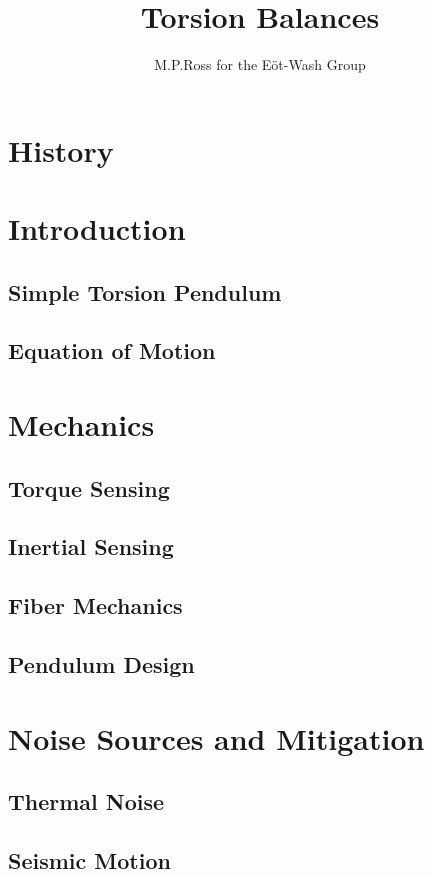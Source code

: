 \documentclass{article}
\begin{document}
\title{Torsion Balances}
\author{M.P.Ross for the E\"ot-Wash Group}

\maketitle
\tableofcontents
\section{History}
\section{Introduction}
\subsection{Simple Torsion Pendulum}
\subsection{Equation of Motion}

\section{Mechanics}
\subsection{Torque Sensing}
\subsection{Inertial Sensing}
\subsection{Fiber Mechanics}
\subsection{Pendulum Design}

\section{Noise Sources and Mitigation}
\subsection{Thermal Noise}
\subsection{Seismic Motion}
\end{document}
